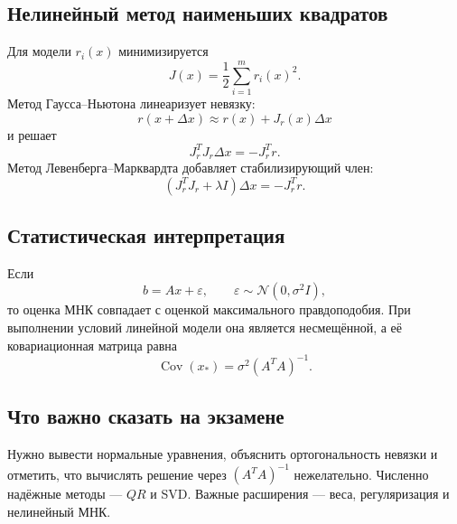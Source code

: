 \subsection{Нелинейный метод наименьших квадратов}

Для модели $r_i(x)$ минимизируется
\[
    J(x)=\frac12\sum_{i=1}^{m}r_i(x)^2.
\]
Метод Гаусса--Ньютона линеаризует невязку:
\[
    r(x+\Delta x)\approx r(x)+J_r(x)\Delta x
\]
и решает
\[
    J_r^TJ_r\Delta x=-J_r^Tr.
\]
Метод Левенберга--Марквардта добавляет стабилизирующий член:
\[
    (J_r^TJ_r+\lambda I)\Delta x=-J_r^Tr.
\]

\subsection{Статистическая интерпретация}

Если
\[
    b=Ax+\varepsilon,
    \qquad
    \varepsilon\sim\mathcal N(0,\sigma^2I),
\]
то оценка МНК совпадает с оценкой максимального правдоподобия. При выполнении
условий линейной модели она является несмещённой, а её ковариационная матрица
равна
\[
    \operatorname{Cov}(x_*)=\sigma^2(A^TA)^{-1}.
\]

\subsection{Что важно сказать на экзамене}

Нужно вывести нормальные уравнения, объяснить ортогональность невязки и отметить,
что вычислять решение через $(A^TA)^{-1}$ нежелательно. Численно надёжные методы
--- $QR$ и SVD. Важные расширения --- веса, регуляризация и нелинейный МНК.

\newpage